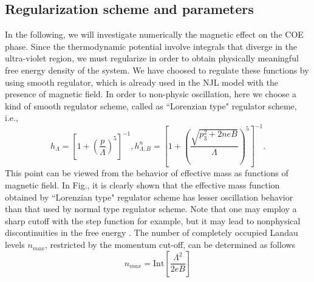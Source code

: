 \documentclass[prd, showpacs,nofootinbib,amsmath,amssymb]{revtex4}
\begin{document}
\subsection{Regularization scheme and parameters}
In the following, we will investigate numerically the magnetic effect on the COE phase.
Since the  thermodynamic potential involve integrals that diverge in the ultra-violet region, we must regularize in order to obtain  physically meaningful free energy
density of the system.
We have  choosed to regulate these functions  by using  smooth regulator, which is already used in the NJL model with the presence of magnetic field.
In order to non-physic oscillation, here we choose a kind of smooth regulator scheme, called as ``Lorenzian type" regulator scheme, i.e.,
\begin{equation}\label{eq:regulator}
  h_{\Lambda} = [1+(\frac{p}{\Lambda})^5]^{-1},   h^n_{\Lambda,B}=[1+(\frac{\sqrt{p_3^2 + 2neB}}{\Lambda})^5]^{-1}.
\end{equation}
This point can be viewed from the behavior of effective mass as functions of magnetic field.
In Fig., it is clearly shown that the effective mass function obtained by  ``Lorenzian type" regulator scheme
has lesser oscillation behavior than that used by normal type regulator scheme.
Note that one may employ a sharp cutoff with the step function for example, but it may lead to nonphysical discontinuities in the free energy \cite{noronha2007color}.
The number of completely occupied Landau levels $n_{max}$, restricted by the momentum cut-off,
can be determined as follows
\begin{equation}\label{eq:nmax}
  n_{max}= \text{Int}[\frac{\Lambda^2}{2eB}]
\end{equation}
\end{document}
